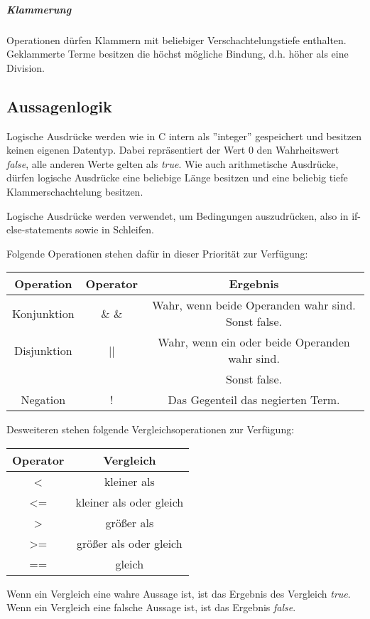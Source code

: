 \subparagraph{Klammerung}
Operationen dürfen Klammern mit beliebiger Verschachtelungstiefe enthalten.
Geklammerte Terme besitzen die höchst mögliche Bindung, d.h. höher als eine Division.

\subsection{Aussagenlogik}
Logische Ausdrücke werden wie in C intern als ''integer'' gespeichert und besitzen keinen eigenen Datentyp. Dabei repräsentiert der Wert 0 den Wahrheitswert \textit{false}, alle anderen Werte gelten als \textit{true}. Wie auch arithmetische Ausdrücke, dürfen logische Ausdrücke eine beliebige Länge besitzen und eine beliebig tiefe Klammerschachtelung besitzen.

Logische Ausdrücke werden verwendet, um Bedingungen auszudrücken, also in if-else-statements sowie in Schleifen.

Folgende Operationen stehen dafür in dieser Priorität zur Verfügung:
\begin{center}
  \begin{tabular}{ | c | c | c | }
    \hline
    Operation & Operator & Ergebnis\\ \hline \hline
    Konjunktion & \& \& & Wahr, wenn beide Operanden wahr sind. Sonst false.\\ \hline
    Disjunktion & || & Wahr, wenn ein oder beide Operanden wahr sind. \\ 
	& & Sonst false.\\ \hline
    Negation & ! & Das Gegenteil das negierten Term.\\ \hline   
  \end{tabular}
\end{center}

Desweiteren stehen folgende Vergleichsoperationen zur Verfügung:
\begin{center}
  \begin{tabular}{ | c | c | }
    \hline
    Operator & Vergleich\\ \hline \hline
    < & kleiner als\\ \hline
    <= & kleiner als oder gleich\\ \hline
    > & größer als\\ \hline
    >= & größer als oder gleich\\ \hline    
    == & gleich\\ \hline    
  \end{tabular}
\end{center}
Wenn ein Vergleich eine wahre Aussage ist, ist das Ergebnis des Vergleich \textit{true}.
Wenn ein Vergleich eine falsche Aussage ist, ist das Ergebnis \textit{false}.

